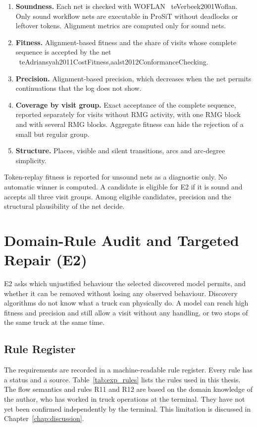 \begin{enumerate}
\item \textbf{Soundness.} Each net is checked with WOFLAN
\	te{Verbeek2001Woflan}. Only sound workflow nets are executable
in ProSiT without deadlocks or leftover tokens. Alignment metrics are
computed only for sound nets.
\item \textbf{Fitness.} Alignment-based fitness and the share of visits
whose complete sequence is accepted by the net
\	te{Adriansyah2011CostFitness,aalst2012ConformanceChecking}.
\item \textbf{Precision.} Alignment-based precision, which decreases
when the net permits continuations that the log does not show.
\item \textbf{Coverage by visit group.} Exact acceptance of the complete
sequence, reported separately for visits without RMG activity, with one
RMG block and with several RMG blocks. Aggregate fitness can hide the
rejection of a small but regular group.
\item \textbf{Structure.} Places, visible and silent transitions, arcs and
arc-degree simplicity.
\end{enumerate}

Token-replay fitness is reported for unsound nets as a diagnostic only.
No automatic winner is computed. A candidate is eligible for E2 if it is
sound and accepts all three visit groups. Among eligible candidates,
precision and the structural plausibility of the net decide.

\section{Domain-Rule Audit and Targeted Repair (E2)}
\label{sec:exp_rules}

E2 asks which unjustified behaviour the selected discovered model
permits, and whether it can be removed without losing any observed
behaviour. Discovery algorithms do not know what a truck can physically
do. A model can reach high fitness and precision and still allow a visit
without any handling, or two stops of the same truck at the same time.

\subsection{Rule Register}

The requirements are recorded in a machine-readable rule register.
Every rule has a status and a source. Table~\ref{tab:exp_rules} lists
the rules used in this thesis. The flow semantics and rules R11 and
R12 are based on the domain knowledge of the author, who has worked in
truck operations at the terminal.
They have not yet been confirmed independently by the terminal. This
limitation is discussed in Chapter~\ref{chap:discussion}.

